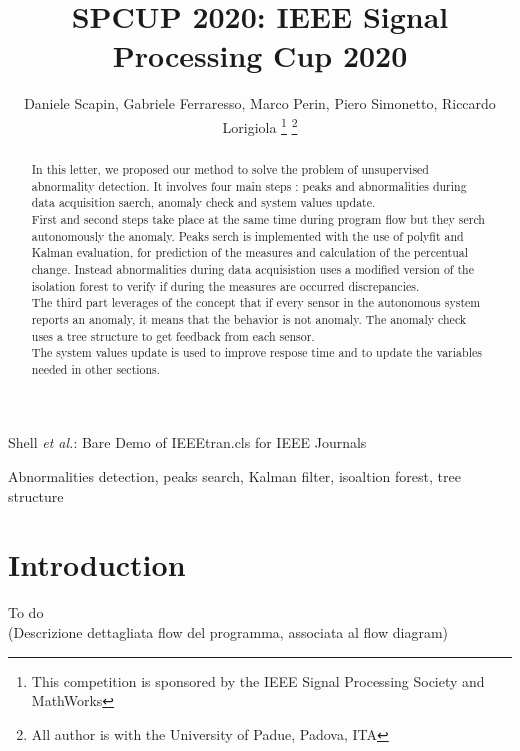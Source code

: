 \documentclass[journal]{IEEEtran}
\begin{document}
\title{SPCUP 2020: IEEE Signal Processing Cup 2020}

\author{Daniele Scapin, Gabriele Ferraresso, Marco Perin, Piero Simonetto, Riccardo Lorigiola
\thanks{This competition is sponsored by the IEEE Signal Processing Society and MathWorks}
\thanks{All author is with the University of Padue, Padova, ITA}}

{Shell \MakeLowercase{\textit{et al.}}: Bare Demo of IEEEtran.cls for IEEE Journals}
\maketitle

\begin{abstract}
In this letter, we proposed our method to solve the problem of unsupervised abnormality detection.
It involves four main steps : peaks and abnormalities during data acquisition saerch, anomaly check and system values update.
\\First and second steps take place at the same time during program flow but they serch autonomously the anomaly. Peaks serch is implemented with the use of polyfit and Kalman evaluation, for prediction of the measures and calculation of the percentual change. Instead abnormalities during data acquisistion uses a modified version of the isolation forest to verify if during the measures are occurred discrepancies.
\\ The third part leverages of the concept that if every sensor in the autonomous system reports an anomaly, it means that the behavior is not anomaly. The anomaly check uses a tree structure to get feedback from each sensor.
\\ The system values update is used to improve respose time and to update the variables needed in other sections.
\end{abstract}

\begin{IEEEkeywords}
Abnormalities detection, peaks search, Kalman filter, isoaltion forest, tree structure
\end{IEEEkeywords}

\IEEEpeerreviewmaketitle

\section{Introduction}

\IEEEPARstart
{T}{o do}
\\(Descrizione dettagliata flow del programma, associata al flow diagram)
\end{document}
